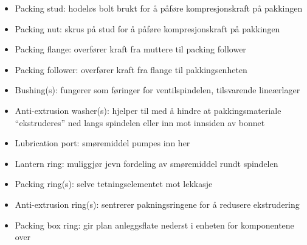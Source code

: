 \begin{itemize}
\item{} Packing stud: hodeløs bolt brukt for å påføre kompresjonskraft på pakkingen
\item{} Packing nut: skrus på stud for å påføre kompresjonskraft på pakkingen
\item{} Packing flange: overfører kraft fra muttere til packing follower
\item{} Packing follower: overfører kraft fra flange til pakkingsenheten
\item{} Bushing(s): fungerer som føringer for ventilspindelen, tilsvarende lineærlager
\item{} Anti-extrusion washer(s): hjelper til med å hindre at pakkingsmateriale ``ekstruderes'' ned langs spindelen eller inn mot innsiden av bonnet
\item{} Lubrication port: smøremiddel pumpes inn her
\item{} Lantern ring: muliggjør jevn fordeling av smøremiddel rundt spindelen
\item{} Packing ring(s): selve tetningselementet mot lekkasje
\item{} Anti-extrusion ring(s): sentrerer pakningsringene for å redusere ekstrudering
\item{} Packing box ring: gir plan anleggsflate nederst i enheten for komponentene over
\end{itemize}



